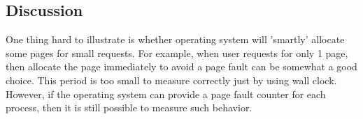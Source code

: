 \subsection{Discussion}
One thing hard to illustrate is whether operating system will 'smartly'
allocate some pages for small requests. For example, when user requests for
only 1 page, then allocate the page immediately to avoid a page fault can be
somewhat a good choice. This period is too small to measure correctly just by
using wall clock. However, if the operating system can provide a page fault
counter for each process, then it is still possible to measure such behavior.
